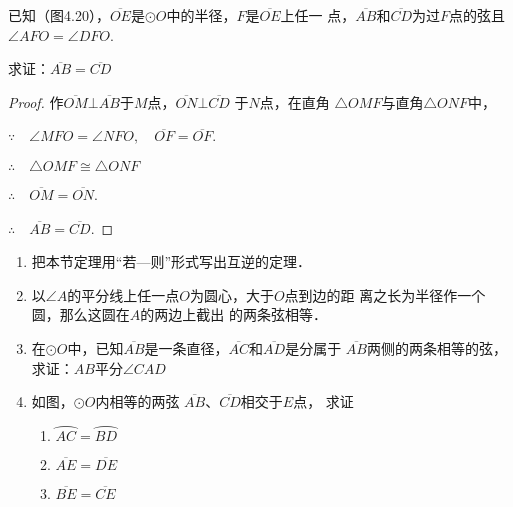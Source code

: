 \begin{example}
    已知（图4.20），$\overline{OE}$是$\odot O$中的半径，$F$是$\overline{OE}$上任一
点，$\overline{AB}$和$\overline{CD}$为过$F$点的弦且$\angle AFO=\angle DFO$.

求证：$\overline{AB}=\overline{CD}$
\end{example}

\begin{figure}[htp]
    \centering
{}
    \caption{}
\end{figure}


\begin{proof}
作$\overline{OM}\bot \overline{AB}$于$M$点，$\overline{ON}\bot \overline{CD}$ 于$N$点，在直角
$\triangle OMF$与直角$\triangle ONF$中，

$\because\quad \angle MFO=\angle NFO,\quad \overline{OF}=\overline{OF}$.

$\therefore\quad \triangle OMF\cong \triangle ONF$

$\therefore\quad \overline{OM}=\overline{ON}$.

$\therefore\quad \overline{AB}=\overline{CD}$.
\end{proof}

\begin{ex}
\begin{enumerate}
    \item 把本节定理用“若—则”形式写出互逆的定理．
    \item 以$\angle A$的平分线上任一点$O$为圆心，大于$O$点到边的距
    离之长为半径作一个圆，那么这圆在$A$的两边上截出
    的两条弦相等．
    \item 在$\odot O$中，已知$\overline{AB}$是一条直径，$\overline{AC}$和$\overline{AD}$是分属于
    $\overline{AB}$两侧的两条相等的弦，
    求证：$AB$平分$\angle CAD$
    \item 如图，$\odot O$内相等的两弦
    $\overline{AB}$、$\overline{CD}$相交于$E$点，
    求证
    \begin{enumerate}
        \item $\wideparen{AC}=\wideparen{BD}$
        \item $\overline{AE}=\overline{DE}$
        \item $\overline{BE}=\overline{CE}$
    \end{enumerate}
\end{enumerate}
\end{ex}

